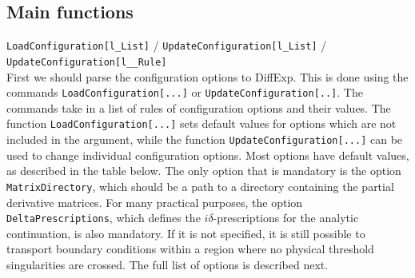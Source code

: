 \documentclass{article}
\begin{document}
\subsection{Main functions}
\texttt{LoadConfiguration[l_List]} / \texttt{UpdateConfiguration[l_List]} / 
\texttt{UpdateConfiguration[l__Rule]}~\\
First we should parse the configuration options to DiffExp. This is done using the commands \texttt{LoadConfiguration[...]} or \texttt{UpdateConfiguration[..]}. The commands take in a list of rules of configuration options and their values. The function \texttt{LoadConfiguration[...]} sets default values for options which are not included in the argument, while the function  \texttt{UpdateConfiguration[...]} can be used to change individual configuration options. Most options have default values, as described in the table below. The only option that is mandatory is the option \texttt{MatrixDirectory}, which should be a path to a directory containing the partial derivative matrices. For many practical purposes, the option \texttt{DeltaPrescriptions}, which defines the $i\delta$-prescriptions for the analytic continuation, is also mandatory. If it is not specified, it is still possible to transport boundary conditions within a region where no physical threshold singularities are crossed. The full list of options is described next.
\end{document}
